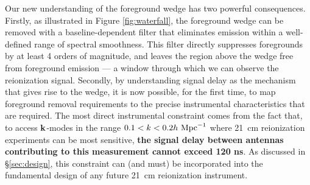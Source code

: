 \documentclass[preprint]{aastex}
\def\k{{\bf k}}
\begin{document}
Our new understanding of the foreground wedge has two powerful consequences.
Firstly, as illustrated in Figure \ref{fig:waterfall}, the foreground wedge can be
removed with a baseline-dependent filter that eliminates emission within a well-defined range of spectral smoothness.
This filter directly suppresses foregrounds by at least
4 orders of magnitude,  
and leaves the region above the wedge free from 
foreground emission --- a window through which we can observe the reionization signal.
Secondly, by understanding signal delay as the mechanism that gives rise to the wedge,
it is now possible, for the first time, to map foreground removal requirements 
to the precise instrumental characteristics that are required.  The most direct instrumental
constraint comes from the fact that, to access $\k$-modes in the range $0.1<k<0.2h\ {\rm Mpc}^{-1}$
where 21~cm reionization experiments can be most sensitive, {\bf the signal delay between antennas
contributing to this measurement cannot exceed 120 ns}.  As discussed in \S\ref{sec:design}, this
constraint can (and must) be incorporated into the fundamental design of any future 21~cm reionization instrument.
\end{document}
